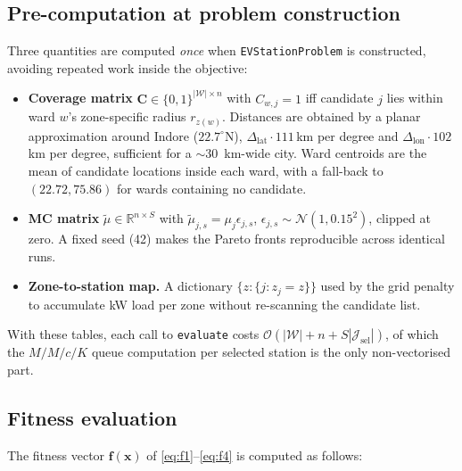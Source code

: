 \documentclass[conference]{IEEEtran}
\begin{document}
\subsection{Pre-computation at problem construction}
\label{subsec:precompute}
Three quantities are computed \emph{once} when
\texttt{EVStationProblem} is constructed, avoiding repeated work inside
the objective:
\begin{itemize}
\item \textbf{Coverage matrix} $\mathbf{C}\!\in\!\{0,1\}^{|\mathcal{W}|\times n}$
      with $C_{w,j}{=}1$ iff candidate $j$ lies within ward $w$'s
      zone-specific radius $r_{z(w)}$. Distances are obtained by a
      planar approximation around Indore
      ($22.7^{\circ}$N), $\Delta_{\text{lat}}\!\cdot\!111$\,km per
      degree and $\Delta_{\text{lon}}\!\cdot\!102$\,km per degree,
      sufficient for a $\sim\!30$~km-wide city. Ward centroids are
      the mean of candidate locations inside each ward, with a
      fall-back to $(22.72, 75.86)$ for wards containing no candidate.
\item \textbf{MC matrix} $\tilde\mu\!\in\!\mathbb{R}^{n\times S}$ with
      $\tilde\mu_{j,s}{=}\mu_{j}\epsilon_{j,s}$,
      $\epsilon_{j,s}\!\sim\!\mathcal{N}(1,0.15^2)$, clipped at zero.
      A fixed seed (42) makes the Pareto fronts reproducible across
      identical runs.
\item \textbf{Zone-to-station map.} A dictionary
      $\{z:\{j : z_{j}=z\}\}$ used by the grid penalty to accumulate
      kW load per zone without re-scanning the candidate list.
\end{itemize}
With these tables, each call to \texttt{evaluate} costs
$\mathcal{O}(|\mathcal{W}|\!+\!n\!+\!S|\mathcal{J}_{\text{sel}}|)$,
of which the $M/M/c/K$ queue computation per selected station is the
only non-vectorised part.

\subsection{Fitness evaluation}
\label{subsec:fitness}
The fitness vector $\mathbf{f}(\mathbf{x})$ of \eqref{eq:f1}--\eqref{eq:f4}
is computed as follows:
\end{document}
